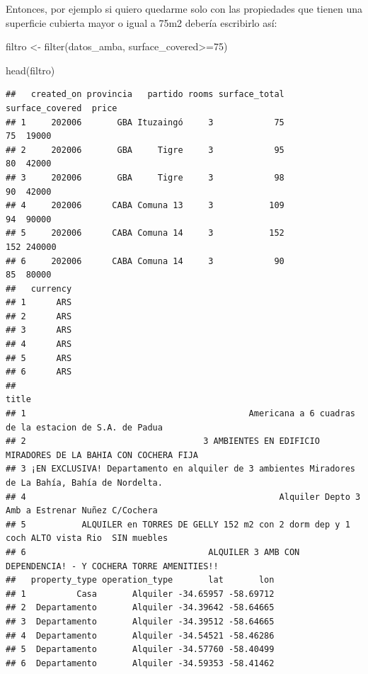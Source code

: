 \documentclass[
  spanish,
]{book}
\newenvironment{Shaded}{\begin{snugshade}}{\end{snugshade}}
\newcommand{\DecValTok}[1]{\textcolor[rgb]{0.00,0.00,0.81}{#1}}
\newcommand{\FunctionTok}[1]{\textcolor[rgb]{0.00,0.00,0.00}{#1}}
\newcommand{\NormalTok}[1]{#1}
\newcommand{\OtherTok}[1]{\textcolor[rgb]{0.56,0.35,0.01}{#1}}
\newcommand{\SpecialCharTok}[1]{\textcolor[rgb]{0.00,0.00,0.00}{#1}}
\begin{document}
Entonces, por ejemplo si quiero quedarme solo con las propiedades que tienen una superficie cubierta mayor o igual a 75m2 debería escribirlo así:

\begin{Shaded}
\begin{Highlighting}[]
\NormalTok{filtro }\OtherTok{\textless{}{-}} \FunctionTok{filter}\NormalTok{(datos\_amba, surface\_covered}\SpecialCharTok{\textgreater{}=}\DecValTok{75}\NormalTok{)}

\FunctionTok{head}\NormalTok{(filtro)}
\end{Highlighting}
\end{Shaded}

\begin{verbatim}
##   created_on provincia   partido rooms surface_total surface_covered  price
## 1     202006       GBA Ituzaingó     3            75              75  19000
## 2     202006       GBA     Tigre     3            95              80  42000
## 3     202006       GBA     Tigre     3            98              90  42000
## 4     202006      CABA Comuna 13     3           109              94  90000
## 5     202006      CABA Comuna 14     3           152             152 240000
## 6     202006      CABA Comuna 14     3            90              85  80000
##   currency
## 1      ARS
## 2      ARS
## 3      ARS
## 4      ARS
## 5      ARS
## 6      ARS
##                                                                                              title
## 1                                            Americana a 6 cuadras de la estacion de S.A. de Padua
## 2                                   3 AMBIENTES EN EDIFICIO MIRADORES DE LA BAHIA CON COCHERA FIJA
## 3 ¡EN EXCLUSIVA! Departamento en alquiler de 3 ambientes Miradores de La Bahía, Bahía de Nordelta.
## 4                                                  Alquiler Depto 3 Amb a Estrenar Nuñez C/Cochera
## 5           ALQUILER en TORRES DE GELLY 152 m2 con 2 dorm dep y 1 coch ALTO vista Rio  SIN muebles
## 6                                    ALQUILER 3 AMB CON DEPENDENCIA! - Y COCHERA TORRE AMENITIES!!
##   property_type operation_type       lat       lon
## 1          Casa       Alquiler -34.65957 -58.69712
## 2  Departamento       Alquiler -34.39642 -58.64665
## 3  Departamento       Alquiler -34.39512 -58.64665
## 4  Departamento       Alquiler -34.54521 -58.46286
## 5  Departamento       Alquiler -34.57760 -58.40499
## 6  Departamento       Alquiler -34.59353 -58.41462
\end{verbatim}
\end{document}
